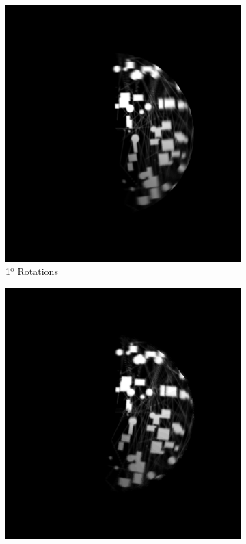 \begin{figure}[H]
    \centering
    \begin{subfigure}[b]{.48\textwidth}
        \centering
        \includegraphics[height=\textwidth]{figures/results/Rotation-Combined/FMT-1.png}
        \caption{1º Rotations}
    \end{subfigure}
    \hfill
    \begin{subfigure}[b]{.48\textwidth}
        \centering
        \includegraphics[height=\textwidth]{figures/results/Rotation-Combined/FMT-5.png}

\end{subfigure}
\end{figure}
